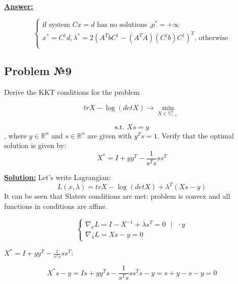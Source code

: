 \underline{\textbf{Answer:}}

\begin{equation*}
    \begin{cases}
        \text{if system } Cx = d \text{ has no solutions ,} p^* = +\infty \\
        x^* = C^{\dag}d, \lambda^* = 2(A^TbC^{\dag} - (A^TA)(C^{\dag}b)C^{\dag})^T \text{, otherwise} \\
    \end{cases}
\end{equation*}

\subsection{Problem №9}
Derive the KKT conditions for the problem 

\begin{equation*}
    trX - \log (detX) \xrightarrow{} \min\limits_{X \in \mathds{S}_{++}^n}
\end{equation*}

\begin{equation*}
   \text{s.t. } Xs = y
\end{equation*}
, where $y \in \mathds{R}^n$ and $s \in \mathds{R}^n$ are given with $y^Ts = 1$. Verify that the optimal solution is given by:
\begin{equation*}
    X^* = I + yy^T - \frac{1}{s^Ts}ss^T
\end{equation*}

\underline{\textbf{Solution:}}
Let's write Lagrangian:
\begin{equation*}
    L(x, \lambda) = trX  - \log (detX) + \lambda^T(Xs - y)
\end{equation*}
It can be seen that Slaters conditions are met: problem is convex and all functions in conditions are affine.

\begin{equation*}
    \begin{cases}
        \nabla_x L = I - X^{-1} + \lambda s^T = 0 \text{ } | \text{ }  \cdot y \\ 
        \nabla_{\lambda} L = Xs - y = 0
    \end{cases}
\end{equation*}

$X^* = I + yy^T - \frac{1}{s^Ts}ss^T$:

\begin{equation*}
    X^*s - y = Is + yy^Ts - \frac{1}{s^Ts}ss^Ts - y = s + y - s - y = 0
\end{equation*}

